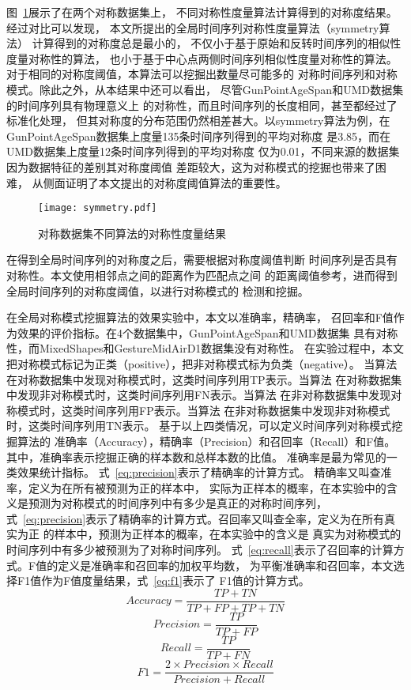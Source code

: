 图~\ref{fig:symmetry_compare}展示了在两个对称数据集上，
不同对称性度量算法计算得到的对称度结果。经过对比可以发现，
本文所提出的全局时间序列对称性度量算法（symmetry算法）
计算得到的对称度总是最小的，
不仅小于基于原始和反转时间序列的相似性度量对称性的算法，
也小于基于中心点两侧时间序列相似性度量对称性的算法。
对于相同的对称度阈值，本算法可以挖掘出数量尽可能多的
对称时间序列和对称模式。除此之外，从本结果中还可以看出，
尽管GunPointAgeSpan和UMD数据集的时间序列具有物理意义上
的对称性，而且时间序列的长度相同，甚至都经过了标准化处理，
但其对称度的分布范围仍然相差甚大。以symmetry算法为例，在
GunPointAgeSpan数据集上度量135条时间序列得到的平均对称度
是3.85，而在UMD数据集上度量12条时间序列得到的平均对称度
仅为0.01，不同来源的数据集因为数据特征的差别其对称度阈值
差距较大，这为对称模式的挖掘也带来了困难，
从侧面证明了本文提出的对称度阈值算法的重要性。
\begin{figure}
  \centering
  \texttt{[image: symmetry.pdf]}
  \caption{对称数据集不同算法的对称性度量结果}
  \label{fig:symmetry_compare}
\end{figure}

在得到全局时间序列的对称度之后，需要根据对称度阈值判断
时间序列是否具有对称性。本文使用相邻点之间的距离作为匹配点之间
的距离阈值参考，进而得到全局时间序列的对称度阈值，以进行对称模式的
检测和挖掘。

在全局对称模式挖掘算法的效果实验中，本文以准确率，精确率，
召回率和F值作为效果的评价指标。在4个数据集中，GunPointAgeSpan和UMD数据集
具有对称性，而MixedShapes和GestureMidAirD1数据集没有对称性。
在实验过程中，本文把对称模式标记为正类（positive），把非对称模式标为负类（negative）。
当算法在对称数据集中发现对称模式时，这类时间序列用TP表示。当算法
在对称数据集中发现非对称模式时，这类时间序列用FN表示。当算法
在非对称数据集中发现对称模式时，这类时间序列用FP表示。当算法
在非对称数据集中发现非对称模式时，这类时间序列用TN表示。
基于以上四类情况，可以定义时间序列对称模式挖掘算法的
准确率（Accuracy），精确率（Precision）和召回率（Recall）和F值。
其中，准确率表示挖掘正确的样本数和总样本数的比值。
准确率是最为常见的一类效果统计指标。
式~\ref{eq:precision}表示了精确率的计算方式。
精确率又叫查准率，定义为在所有被预测为正的样本中，
实际为正样本的概率，在本实验中的含义是预测为对称模式的时间序列中有多少是真正的对称时间序列，
式~\ref{eq:precision}表示了精确率的计算方式。召回率又叫查全率，定义为在所有真实为正
的样本中，预测为正样本的概率，在本实验中的含义是
真实为对称模式的时间序列中有多少被预测为了对称时间序列。
式~\ref{eq:recall}表示了召回率的计算方式。F值的定义是准确率和召回率的加权平均数，
为平衡准确率和召回率，本文选择F1值作为F值度量结果，式~\ref{eq:f1}表示了
F1值的计算方式。
\begin{equation}
  Accuracy=\frac{TP+TN}{TP+FP+TP+TN}
  \label{eq:Accuracy}
\end{equation}
\begin{equation}
  Precision=\frac{TP}{TP+FP}
  \label{eq:precision}
\end{equation}
\begin{equation}
  Recall=\frac{TP}{TP+FN}
  \label{eq:recall}
\end{equation}
\begin{equation}
  F1=\frac{2 \times Precision \times Recall}{Precision+Recall}
  \label{eq:f1}
\end{equation}

